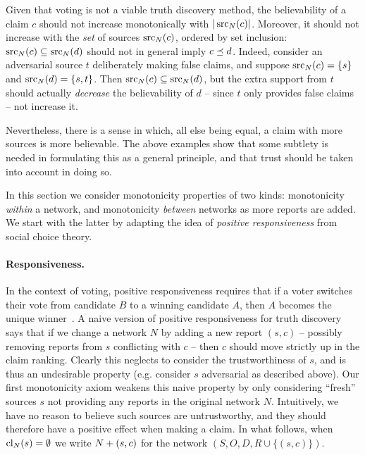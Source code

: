 Given that voting is not a viable truth discovery method, the believability of
a claim $c$ should not increase monotonically with $|\operatorname{src}_N(c)|$. Moreover, it
should not increase with the \emph{set} of sources $\operatorname{src}_N(c)$, ordered by set
inclusion: $\operatorname{src}_N(c) \subseteq \operatorname{src}_N(d)$ should not in general imply $c \preceq
d$. Indeed, consider an adversarial source $t$ deliberately making false
claims, and suppose $\operatorname{src}_N(c) = \{s\}$ and $\operatorname{src}_N(d) = \{s, t\}$. Then
$\operatorname{src}_N(c) \subseteq \operatorname{src}_N(d)$, but the extra support from $t$ should actually
\emph{decrease} the believability of $d$ -- since $t$ only provides false
claims -- not increase it.

Nevertheless, there is a sense in which, all else being equal, a claim with
more sources is more believable. The above examples show that some subtlety is
needed in formulating this as a general principle, and that trust should be
taken into account in doing so.

In this section we consider monotonicity properties of two kinds: monotonicity
\emph{within} a network, and monotonicity \emph{between} networks as more
reports are added. We start with the latter by adapting the idea of
\emph{positive responsiveness} from social choice theory.

\paragraph{Responsiveness.}

In the context of voting, positive responsiveness requires that if
a voter switches their vote from candidate $B$ to a winning candidate $A$, then
$A$ becomes the unique winner~\cite{zwicker2016voting}.
%
A naive version of positive responsiveness for truth discovery says that if we
change a network $N$ by adding a new report $(s, c)$ -- possibly removing
reports from $s$ conflicting with $c$ -- then $c$ should move strictly up in
the claim ranking. Clearly this neglects to consider the trustworthiness of
$s$, and is thus an undesirable property (e.g. consider $s$ adversarial as
described above). Our first monotonicity axiom weakens this naive property by
only considering ``fresh'' sources $s$ not providing any reports in the original
network $N$. Intuitively, we have no reason to believe such sources are
untrustworthy, and they should therefore have a positive effect when making a
claim.
%
In what follows, when $\operatorname{cl}_N(s) = \emptyset$ we write ${N} + ({s}, {c})$
for the network $(S, O, D, R \cup \{(s, c)\})$.

